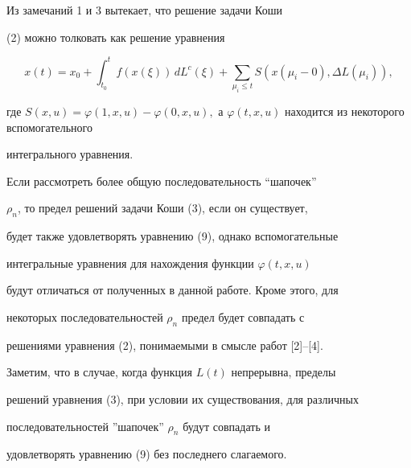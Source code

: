 Из замечаний 1 и 3 вытекает, что решение задачи Коши


(2) можно толковать как решение уравнения


\begin{equation}


x(t)=x_0+\int_{t_0}^{t}f(x(\xi))\,dL^c(\xi)+


\sum_{\mu_i\leq t}S(x(\mu_i-0),\Delta L(\mu_i)),


\end{equation}


где $S(x,u)=\varphi(1,x,u)-\varphi(0,x,u),


$ а $\varphi(t,x,u)$ находится из некоторого вспомогательного


интегрального уравнения.





Если рассмотреть  более общую последовательность ``шапочек''


$\rho_n$, то предел решений задачи Коши (3), если он существует,


будет также удовлетворять уравнению (9), однако вспомогательные


интегральные уравнения для нахождения функции $\varphi(t,x,u)$


будут отличаться от полученных в данной работе. Кроме этого, для


некоторых последовательностей $\rho_n$ предел будет совпадать с


решениями уравнения (2), понимаемыми в смысле работ [2]--[4].


Заметим, что в случае, когда функция $L(t)$ непрерывна, пределы


решений уравнения (3), при условии их существования, для различных


последовательностей ''шапочек'' $\rho_n$ будут совпадать и


удовлетворять уравнению (9) без последнего слагаемого.








